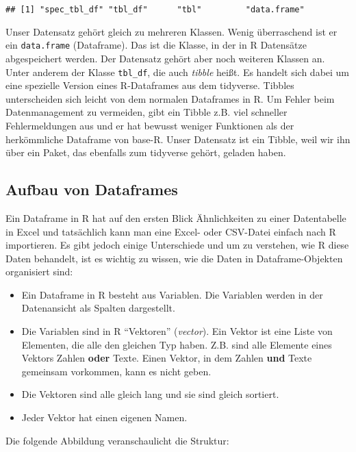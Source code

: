 \documentclass[
]{book}
\providecommand{\tightlist}{%
  \setlength{\itemsep}{0pt}\setlength{\parskip}{0pt}}
\begin{document}
\begin{verbatim}
## [1] "spec_tbl_df" "tbl_df"      "tbl"         "data.frame"
\end{verbatim}

Unser Datensatz gehört gleich zu mehreren Klassen. Wenig überraschend ist er ein \texttt{data.frame} (Dataframe). Das ist die Klasse, in der in R Datensätze abgespeichert werden. Der Datensatz gehört aber noch weiteren Klassen an. Unter anderem der Klasse \texttt{tbl\_df}, die auch \emph{tibble} heißt. Es handelt sich dabei um eine spezielle Version eines R-Dataframes aus dem tidyverse. Tibbles unterscheiden sich leicht von dem normalen Dataframes in R. Um Fehler beim Datenmanagement zu vermeiden, gibt ein Tibble z.B. viel schneller Fehlermeldungen aus und er hat bewusst weniger Funktionen als der herkömmliche Dataframe von base-R. Unser Datensatz ist ein Tibble, weil wir ihn über ein Paket, das ebenfalls zum tidyverse gehört, geladen haben.

\hypertarget{aufbau-von-dataframes}{%
\subsection{Aufbau von Dataframes}\label{aufbau-von-dataframes}}

Ein Dataframe in R hat auf den ersten Blick Ähnlichkeiten zu einer Datentabelle in Excel und tatsächlich kann man eine Excel- oder CSV-Datei einfach nach R importieren. Es gibt jedoch einige Unterschiede und um zu verstehen, wie R diese Daten behandelt, ist es wichtig zu wissen, wie die Daten in Dataframe-Objekten organisiert sind:

\begin{itemize}
\tightlist
\item
  Ein Dataframe in R besteht aus Variablen. Die Variablen werden in der Datenansicht als Spalten dargestellt.
\item
  Die Variablen sind in R ``Vektoren'' (\emph{vector}). Ein Vektor ist eine Liste von Elementen, die alle den gleichen Typ haben. Z.B. sind alle Elemente eines Vektors Zahlen \textbf{oder} Texte. Einen Vektor, in dem Zahlen \textbf{und} Texte gemeinsam vorkommen, kann es nicht geben.
\item
  Die Vektoren sind alle gleich lang und sie sind gleich sortiert.
\item
  Jeder Vektor hat einen eigenen Namen.
\end{itemize}

Die folgende Abbildung veranschaulicht die Struktur:
\end{document}
